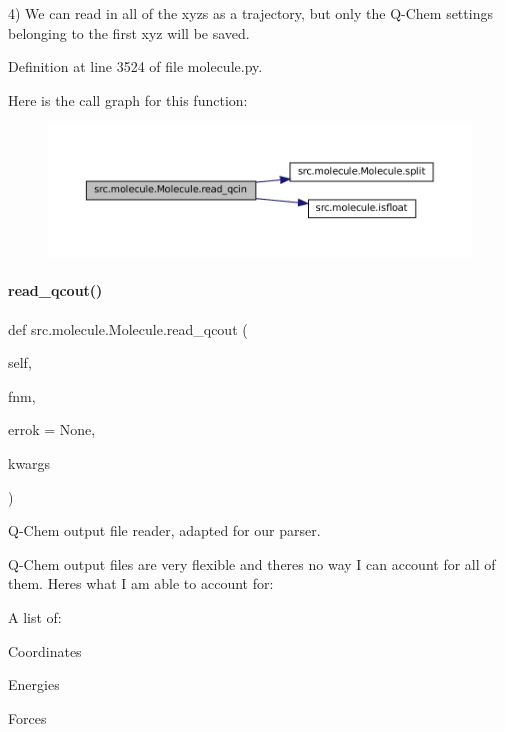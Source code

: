 4) We can read in all of the xyz\textquotesingle{}s as a trajectory, but only the Q-\/\+Chem settings belonging to the first xyz will be saved. 

Definition at line 3524 of file molecule.\+py.

Here is the call graph for this function\+:
\nopagebreak
\begin{figure}[H]
\begin{center}
\leavevmode
\includegraphics[width=350pt]{classsrc_1_1molecule_1_1Molecule_aa9caaf6d7ccff3a9077da98b4c8096a9_cgraph}
\end{center}
\end{figure}
\mbox{\label{classsrc_1_1molecule_1_1Molecule_a243cce870c970db8cac7f102325e872b}} 
\paragraph{\texorpdfstring{read\+\_\+qcout()}{read\_qcout()}}
{\footnotesize\ttfamily def src.\+molecule.\+Molecule.\+read\+\_\+qcout (\begin{DoxyParamCaption}\item[{}]{self,  }\item[{}]{fnm,  }\item[{}]{errok = {\ttfamily None},  }\item[{}]{kwargs }\end{DoxyParamCaption})}



Q-\/\+Chem output file reader, adapted for our parser. 

Q-\/\+Chem output files are very flexible and there\textquotesingle{}s no way I can account for all of them. Here\textquotesingle{}s what I am able to account for\+:

A list of\+:
\begin{DoxyItemize}
\item Coordinates
\item Energies
\item Forces
\end{DoxyItemize}

